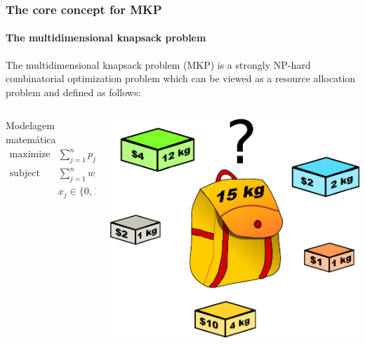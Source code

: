 \documentclass[10pt,fleqn]{beamer}
\begin{document}
\begin{frame}
	\frametitle{The core concept for MKP}
	\framesubtitle{The multidimensional knapsack problem}
The multidimensional knapsack problem (MKP) is a strongly NP-hard combinatorial
optimization problem which can be viewed as a resource allocation problem and
defined as follows:
  \begin{columns}[T]
	  \begin{column}{.5\textwidth}
      \begin{block}{Modelagem matemática}
	    { \footnotesize
\begin{align*}
  \text{maximize} & \sum_{j=1}^n p_j x_j \\
  \text{subject to} & \sum_{j=1}^n w_{ij} x_j \leqslant c_i \quad i \in \{1, \ldots, m\}\\
   & x_j \in \{0, 1\}, \quad j \in \{1, \ldots, n\}.
\end{align*}
		}
      \end{block}
    \end{column} \pause
    \begin{column}{.5\textwidth}
	  \begin{center}
        \includegraphics[scale=0.3]{knapsack}
	  \end{center}
    \end{column}
  \end{columns}
\end{frame}
\end{document}
